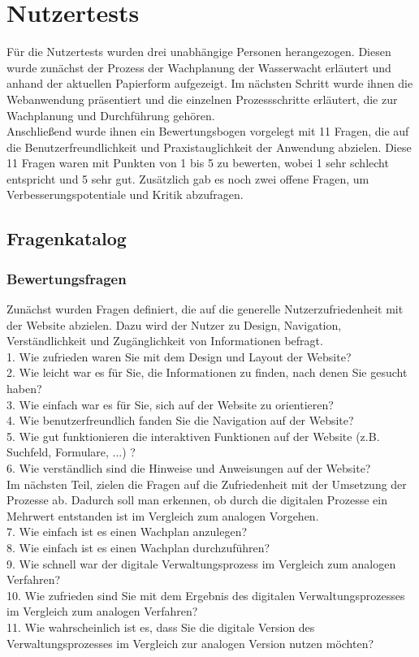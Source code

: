 \documentclass[fontsize=12pt,openright,oneside,paper=a4,BCOR=1cm]{scrbook}
\begin{document}
\section{Nutzertests}

Für die Nutzertests wurden drei unabhängige Personen herangezogen. Diesen wurde zunächst der Prozess der Wachplanung der Wasserwacht erläutert und anhand der aktuellen Papierform aufgezeigt. Im nächsten Schritt wurde ihnen die Webanwendung präsentiert und die einzelnen Prozessschritte erläutert, die zur Wachplanung und Durchführung gehören. \\
Anschließend wurde ihnen ein Bewertungsbogen vorgelegt mit 11 Fragen, die auf die Benutzerfreundlichkeit und Praxistauglichkeit der Anwendung abzielen. Diese 11 Fragen waren mit Punkten von 1 bis 5 zu bewerten, wobei 1 sehr schlecht entspricht und 5 sehr gut. Zusätzlich gab es noch zwei offene Fragen, um Verbesserungspotentiale und Kritik abzufragen. \\

\subsection{Fragenkatalog}
\subsubsection{Bewertungsfragen}
Zunächst wurden Fragen definiert, die auf die generelle Nutzerzufriedenheit mit der Website abzielen. Dazu wird der Nutzer zu Design, Navigation, Verständlichkeit und Zugänglichkeit von Informationen befragt.\\
1. Wie zufrieden waren Sie mit dem Design und Layout der Website?\\
2. Wie leicht war es für Sie, die Informationen zu finden, nach denen Sie gesucht haben?\\
3. Wie einfach war es für Sie, sich auf der Website zu orientieren?\\
4. Wie benutzerfreundlich fanden Sie die Navigation auf der Website?\\
5. Wie gut funktionieren die interaktiven Funktionen auf der Website (z.B. Suchfeld, Formulare, ...) ?\\
6. Wie verständlich sind die Hinweise und Anweisungen auf der Website?\\

Im nächsten Teil, zielen die Fragen auf die Zufriedenheit mit der Umsetzung der Prozesse ab. Dadurch soll man erkennen, ob durch die digitalen Prozesse ein Mehrwert entstanden ist im Vergleich zum analogen Vorgehen.\\
7. Wie einfach ist es einen Wachplan anzulegen?\\
8. Wie einfach ist es einen Wachplan durchzuführen? \\
9. Wie schnell war der digitale Verwaltungsprozess im Vergleich zum analogen Verfahren? \\
10. Wie zufrieden sind Sie mit dem Ergebnis des digitalen Verwaltungsprozesses im Vergleich zum analogen Verfahren? \\
11. Wie wahrscheinlich ist es, dass Sie die digitale Version des Verwaltungsprozesses im Vergleich zur analogen Version nutzen möchten?\\
\end{document}
